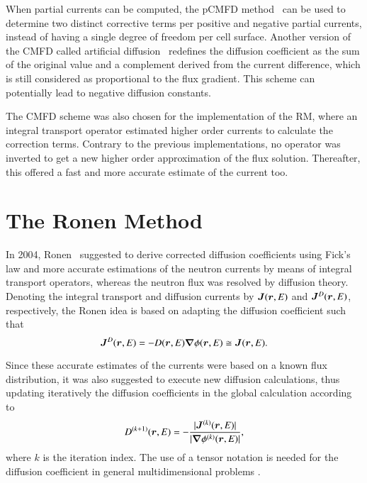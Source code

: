 When partial currents can be computed, the pCMFD method~\cite{Cho-2003} can be used to determine two distinct corrective terms per positive and negative partial currents, instead of having a single degree of freedom per cell surface. Another version of the CMFD called artificial diffusion~\cite{Zhu-2016,Jarrett-2016} redefines the diffusion coefficient as the sum of the original value and a complement derived from the current difference, which is still considered as proportional to the flux gradient. This scheme can potentially lead to negative diffusion constants.

The CMFD scheme was also chosen for the implementation of the RM, where an integral transport operator estimated higher order currents to calculate the correction terms. Contrary to the previous implementations, no operator was inverted to get a new higher order approximation of the flux solution. Thereafter, this offered a fast and more accurate estimate of the current too.


\section{The Ronen Method}
\label{sec:RM}

In 2004, Ronen~\cite{Ronen-2004} suggested to derive corrected diffusion coefficients using Fick's law and more accurate estimations of the neutron currents by means of integral transport operators, whereas the neutron flux was resolved by diffusion theory. Denoting the integral transport and diffusion currents by $\bm{J}(\bm{r},E)$ and $\bm{J}^D(\bm{r},E)$, respectively, the Ronen idea is based on adapting the diffusion coefficient such that
\begin{equation}
  \label{eq:Fick}
  \bm{J}^D(\bm{r},E) = -D(\bm{r},E)\bm{\nabla}\phi(\bm{r},E) \cong \bm{J}(\bm{r},E).
\end{equation}

Since these accurate estimates of the currents were based on a known flux distribution, it was also suggested to execute new diffusion calculations, thus updating iteratively the diffusion coefficients in the global calculation according to
\begin{equation}
  \label{eq:RM-it}
  D^{(k+1)}(\bm{r},E) = - \frac{\lvert \bm{J}^{(k)}(\bm{r},E) \rvert}{\lvert \bm{\nabla} \phi^{(k)}(\bm{r},E) \rvert},
\end{equation}
where $k$ is the iteration index. The use of a tensor notation is needed for the diffusion coefficient in general multidimensional problems \cite{boffi1972tensorial}.

